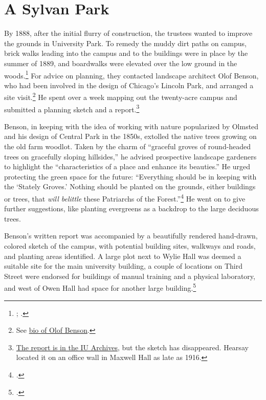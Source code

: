 \documentclass[
  american,
  letterpaper,
]{scrreprt}
\begin{document}
\section{A Sylvan Park}\label{a-sylvan-park}

By 1888, after the initial flurry of construction, the trustees wanted
to improve the grounds in University Park. To remedy the muddy dirt
paths on campus, brick walks leading into the campus and to the
buildings were in place by the summer of 1889, and boardwalks were
elevated over the low ground in the woods.\footnote{;
  .} For advice on planning, they contacted
landscape architect Olof Benson, who had been involved in the design of
Chicago's Lincoln Park, and arranged a site visit.\footnote{See
  \href{https://www.tclf.org/pioneer/olof-benson}{bio of Olof Benson}.}
He spent over a week mapping out the twenty-acre campus and submitted a
planning sketch and a report.\footnote{\href{https://purl.dlib.indiana.edu/iudl/archives/iubot/1888-11-08}{The
  report is in the IU Archives}, but the sketch has disappeared. Hearsay
  located it on an office wall in Maxwell Hall as late as 1916.}

Benson, in keeping with the idea of working with nature popularized by
Olmsted and his design of Central Park in the 1850s, extolled the native
trees growing on the old farm woodlot. Taken by the charm of ``graceful
groves of round-headed trees on gracefully sloping hillsides,'' he
advised prospective landscape gardeners to highlight the
``characteristics of a place and enhance its beauties.'' He urged
protecting the green space for the future: ``Everything should be in
keeping with the `Stately Groves.' Nothing should be planted on the
grounds, either buildings or trees, that \emph{will belittle} these
Patriarchs of the Forest.''\footnote{.} He went on to give further suggestions, like
planting evergreens as a backdrop to the large deciduous trees.

Benson's written report was accompanied by a beautifully rendered
hand-drawn, colored sketch of the campus, with potential building sites,
walkways and roads, and planting areas identified. A large plot next to
Wylie Hall was deemed a suitable site for the main university building,
a couple of locations on Third Street were endorsed for buildings of
manual training and a physical laboratory, and west of Owen Hall had
space for another large building.\footnote{.}
\end{document}
